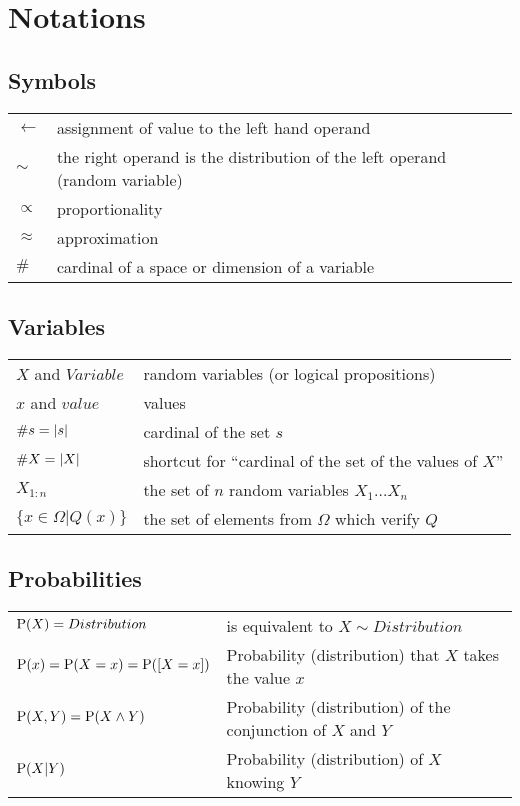 \chapter*{Notations}

\section*{Symbols}
\begin{tabular}{ll}
$\leftarrow$ & assignment of value to the left hand operand \\
$\sim$ & the right operand is the distribution of the left operand (random variable) \\
$\propto$ & proportionality \\
$\approx$ & approximation \\
$\#$ & cardinal of a space or dimension of a variable \\
\end{tabular}

\section*{Variables}
\begin{tabular}{ll}
$X$ and $Variable$ & random variables (or logical propositions) \\
$x$ and $value$ & values \\
$\#s = \left\lvert s\right\rvert$ & cardinal of the set $s$ \\
$\#X = \left\lvert X\right\rvert$ & shortcut for ``cardinal of the set of the values of $X$'' \\
$X_{1:n}$ & the set of $n$ random variables $X_1 \dots X_n$ \\
$\{x \in \Omega | Q(x)\}$ & the set of elements from $\Omega$ which verify $Q$ \\
\end{tabular}

\section*{Probabilities}

\begin{tabular}{ll}
$\mathrm{P}(X) = Distribution$ & is equivalent to $X \sim Distribution$\\
$\mathrm{P}(x) = \mathrm{P}(X=x) = \mathrm{P}([X=x])$ & Probability (distribution) that $X$ takes the value $x$ \\
$\mathrm{P}(X,Y) = \mathrm{P}(X\wedge Y)$ & Probability (distribution) of the conjunction of $X$ and $Y$ \\
$\mathrm{P}(X|Y)$ & Probability (distribution) of $X$ knowing $Y$ \\
\end{tabular}


